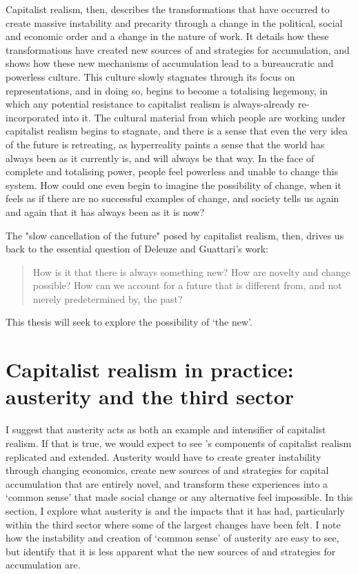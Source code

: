 Capitalist realism, then, describes the transformations that have occurred to create massive instability and precarity through a change in the political, social and economic order and a change in the nature of work. It details how these transformations have created new sources of and strategies for accumulation, and shows how these new mechanisms of accumulation lead to a bureaucratic and powerless culture. This culture slowly stagnates through its focus on representations, and in doing so, begins to become a totalising hegemony, in which any potential resistance to capitalist realism is always-already re-incorporated into it. The cultural material from which people are working under capitalist realism begins to stagnate, and there is a sense that even the very idea of the future is retreating, as hyperreality paints a sense that the world has always been as it currently is, and will always be that way. In the face of complete and totalising power, people feel powerless and unable to change this system. How could one even begin to imagine the possibility of change, when it feels as if there are no successful examples of change, and society tells us again and again that it has always been as it is now? 

The "slow cancellation of the future" \citep[p. 5]{fisher_ghosts_2014} posed by capitalist realism, then, drives us back to the essential question of Deleuze and Guattari's work:
\begin{quote}
How is it that there is always something new? How are novelty and change possible? How can we account for a future that is different from, and not merely predetermined by, the past? \citep[p. 23]{shaviro_deleuzes_2007} 
\end{quote}

This thesis will seek to explore the possibility of `the new'.

\section{Capitalist realism in practice: austerity and the third sector}
\label{sec:capitalist-realism-in-practice-austerity-and-the-third-sector}
I suggest that austerity acts as both an example and intensifier of capitalist realism. If that is true, we would expect to see \citet{shonkwiler_reading_2014}'s components of capitalist realism replicated and extended. Austerity would have to create greater instability through changing economics, create new sources of and strategies for capital accumulation that are entirely novel, and transform these experiences into a `common sense' that made social change or any alternative feel impossible. In this section, I explore what austerity is and the impacts that it has had, particularly within the third sector where some of the largest changes have been felt. I note how the instability and creation of `common sense' of austerity are easy to see, but identify that it is less apparent what the new sources of and strategies for accumulation are.    

